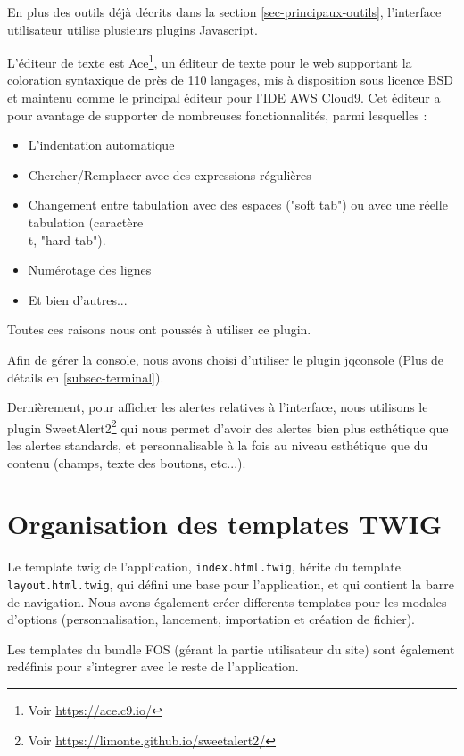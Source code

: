 En plus des outils déjà décrits dans la section \ref{sec-principaux-outils}, l'interface utilisateur utilise plusieurs plugins Javascript.

L'éditeur de texte est Ace\footnote{Voir \url{https://ace.c9.io/}}, un éditeur de texte pour le web supportant la coloration syntaxique de près de 110 langages, mis à disposition sous licence BSD et maintenu comme le principal éditeur pour l'IDE AWS Cloud9. Cet éditeur a pour avantage de supporter de nombreuses fonctionnalités, parmi lesquelles :

\begin{itemize}
  \item L'indentation automatique
  \item Chercher/Remplacer avec des expressions régulières
  \item Changement entre tabulation avec des espaces ("soft tab") ou avec une réelle tabulation (caractère \\t, "hard tab").
  \item Numérotage des lignes
  \item Et bien d'autres...
\end{itemize}

Toutes ces raisons nous ont poussés à utiliser ce plugin.

Afin de gérer la console, nous avons choisi d'utiliser le plugin jqconsole (Plus de détails en \ref{subsec-terminal}).

Dernièrement, pour afficher les alertes relatives à l'interface, nous utilisons le plugin SweetAlert2\footnote{Voir \url{https://limonte.github.io/sweetalert2/}} qui nous permet d'avoir des alertes bien plus esthétique que les alertes standards, et personnalisable à la fois au niveau esthétique que du contenu (champs, texte des boutons, etc...).

\section{Organisation des templates TWIG}

Le template twig de l'application, \texttt{index.html.twig}, hérite du template \texttt{layout.html.twig}, qui défini une base pour l'application, et qui contient la barre de navigation. Nous avons également créer differents templates pour les modales d'options (personnalisation, lancement, importation et création de fichier).

Les templates du bundle FOS (gérant la partie utilisateur du site) sont également redéfinis pour s'integrer avec le reste de l'application.

